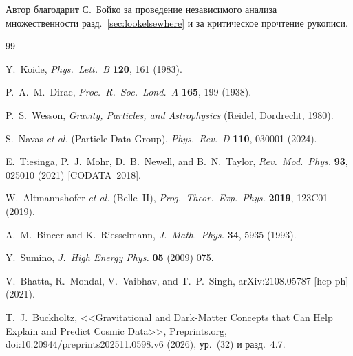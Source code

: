 \documentclass[aps,prd,twocolumn,amsmath,amssymb,floatfix,nofootinbib]{revtex4-2}
\begin{document}
\begin{acknowledgments}
Автор благодарит С.~Бойко за проведение независимого анализа множественности
разд.~\ref{sec:lookelsewhere} и за критическое прочтение рукописи.
\end{acknowledgments}

\begin{thebibliography}{99}

 Y.~Koide,
\textit{Phys.\ Lett.\ B} \textbf{120}, 161 (1983).

 P.~A.~M.~Dirac,
\textit{Proc.\ R.\ Soc.\ Lond.\ A} \textbf{165}, 199 (1938).

 P.~S.~Wesson,
\textit{Gravity, Particles, and Astrophysics} (Reidel, Dordrecht, 1980).

 S.~Navas \textit{et al.} (Particle Data Group),
\textit{Phys.\ Rev.\ D} \textbf{110}, 030001 (2024).

 E.~Tiesinga, P.~J.~Mohr, D.~B.~Newell, and B.~N.~Taylor,
\textit{Rev.\ Mod.\ Phys.} \textbf{93}, 025010 (2021) [CODATA~2018].

 W.~Altmannshofer \textit{et al.} (Belle~II),
\textit{Prog.\ Theor.\ Exp.\ Phys.} \textbf{2019}, 123C01 (2019).

 A.~M.~Bincer and K.~Riesselmann,
\textit{J.\ Math.\ Phys.} \textbf{34}, 5935 (1993).

 Y.~Sumino,
\textit{J.\ High Energy Phys.} \textbf{05} (2009) 075.

 V.~Bhatta, R.~Mondal, V.~Vaibhav, and T.~P.~Singh,
arXiv:2108.05787 [hep-ph] (2021).

 T.~J.~Buckholtz, <<Gravitational and Dark-Matter
Concepts that Can Help Explain and Predict Cosmic Data>>, Preprints.org,
doi:10.20944/preprints202511.0598.v6 (2026), ур.~(32) и разд.~4.7.

\end{thebibliography}
\end{document}
